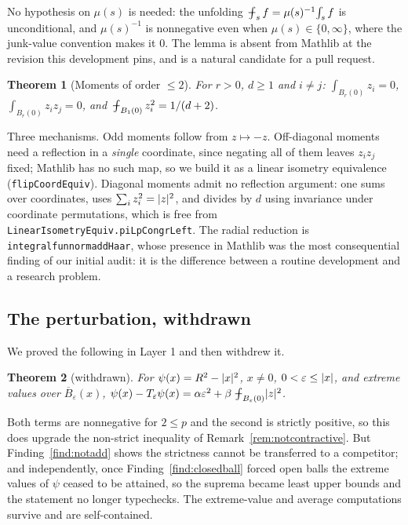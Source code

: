 \documentclass[11pt,reqno]{amsart}
\newcommand{\fint}{\mathop{\mathrlap{\,\rule[0.62ex]{0.62em}{0.5pt}}\int}}
\newcommand{\LEANREF}[1]{\texttt{\small\def\_{\textunderscore\allowbreak}#1}}
\newcommand{\eps}{\varepsilon}
\newcommand{\Op}{T_\eps}
\newcommand{\avgint}{\fint}
\DeclarePairedDelimiter{\abs}{\lvert}{\rvert}
\theoremstyle{plain}
\newtheorem{theorem}{Theorem}[section]
\theoremstyle{definition}
\begin{document}
No hypothesis on $\mu(s)$ is needed: the unfolding
$\avgint_s f = \mu(s)^{-1}\!\int_s f$ is unconditional, and $\mu(s)^{-1}$ is
nonnegative even when $\mu(s) \in \{0,\infty\}$, where the junk-value
convention makes it $0$.
The lemma is absent from Mathlib at the revision this development pins, and is
a natural candidate for a pull request.

\begin{theorem}[Moments of order $\le 2$]\label{thm:moments}
For $r>0$, $d \ge 1$ and $i \ne j$:
$\int_{B_r(0)} z_i = 0$, $\int_{B_r(0)} z_i z_j = 0$, and
$\avgint_{B_1(0)} z_i^2 = 1/(d+2)$.
\end{theorem}

Three mechanisms. Odd moments follow from $z \mapsto -z$. Off-diagonal moments
need a reflection in a \emph{single} coordinate, since negating all of them
leaves $z_i z_j$ fixed; Mathlib has no such map, so we build it as a linear
isometry equivalence (\LEANREF{flipCoordEquiv}). Diagonal moments admit no
reflection argument: one sums over coordinates, uses
$\sum_i z_i^2 = \abs{z}^2$, and divides by $d$ using invariance under
coordinate permutations, which is free from
\LEANREF{LinearIsometryEquiv.piLpCongrLeft}. The radial reduction is
\LEANREF{integral\_fun\_norm\_addHaar}, whose presence in Mathlib was the most
consequential finding of our initial audit: it is the difference between a
routine development and a research problem.

\subsection{The perturbation, withdrawn}\label{ssec:psi}

We proved the following in Layer 1 and then withdrew it.

\begin{theorem}[withdrawn]\label{thm:gap}
For $\psi(x) = R^2 - \abs{x}^2$, $x \ne 0$, $0 < \eps \le \abs{x}$, and extreme
values over $\overline{B}_\eps(x)$,
$\psi(x) - \Op\psi(x) = \alpha\eps^2
  + \beta \avgint_{B_\eps(0)} \abs{z}^2$.
\end{theorem}

Both terms are nonnegative for $2 \le p$ and the second is strictly positive,
so this does upgrade the non-strict inequality of
Remark~\ref{rem:notcontractive}. But Finding~\ref{find:notadd} shows the
strictness cannot be transferred to a competitor; and independently, once
Finding~\ref{find:closedball} forced open balls the extreme values of $\psi$
ceased to be attained, so the suprema became least upper bounds and the
statement no longer typechecks. The extreme-value and average computations
survive and are self-contained.
\end{document}
